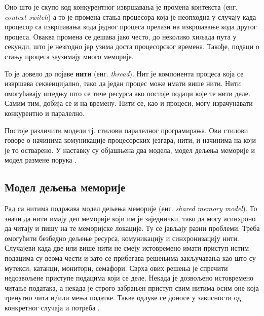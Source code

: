 \documentclass[12pt,oneside]{memoir}
\begin{document}
Оно што је скупо код конкурентног извршавања је промена контекста (енг. \textit{context switch}) а то је промена стања процесора која је неопходна у случају када процесор са извршавања кода једног процеса прелази на извршавање кода другог процеса. Оваква промена се дешава јако често, до неколико хиљада пута у секунди,  што је незгодно јер узима доста процесорског времена. Такође, подаци о стању процеса заузимају много меморије.

То је довело до појаве \textbf{нити} (енг. \textit{thread}). Нит је компонента процеса која се извршава секвенцијално, тако да један процес може имати више нити. Нити омогућавају штедњу што се тиче ресурса ако постоје подаци које те нити деле. Самим тим, добија се и на времену. Нити се, као и процеси, могу израчунавати конкурентно и паралелно.

Постоје различити модели тј. стилови паралелног програмирања. Ови стилови говоре о начинима комуникације процесорских језгара, нити, и начинима на који је то остварено. У наставку су објашњена два модела, модел дељења меморије и модел размене порука \cite{survey}.

\subsection{Модел дељења меморије}
Рад са нитима подржава модел дељења меморије (енг. \textit{shared memory model}). То значи да нити имају део меморије који им је заједнички, тако да могу асинхроно да читају и пишу на те меморијске локације. Ту се јављају разни проблеми. Треба омогућити безбедно дељење ресурса, комуникацију и синхронизацију нити.  Случајеви када две или више нити не смеју истовремено имати приступ истим подацима су веома чести и зато се прибегава решењима закључавања као што су мутекси, катанци, монитори, семафори. Сврха ових решења је спречити недозвољене приступе подацима који се деле. Некада је дозвољено истовремено читање података, а некада је строго забрањен приступ свим нитима осим оне која тренутно чита и/или мења податке. Такве одлуке се доносе у зависности од конкретног случаја и потреба \cite{progInScala3, survey}.
\end{document}
